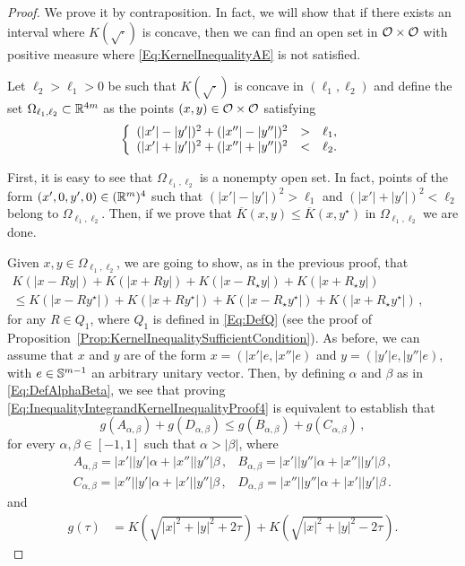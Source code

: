 \begin{proof}
We prove it by contraposition. In fact, we will show that if there exists an interval where $K(\sqrt{\cdot})$ is concave, then we can find an open set in $\mathcal{O} \times \mathcal{O}$ with positive measure where \eqref{Eq:KernelInequalityAE} is not satisfied.

Let $\ell_2>\ell_1>0$ be such that $K(\sqrt{\cdot})$ is concave in $(\ell_1,\ell_2)$ and define the set $\Omega_{\ell_1,\ell_2}\subset \mathbb{R}^{4m}$ as the points $(x,y)\in \mathcal{O}\times \mathcal{O}$ satisfying
\begin{equation}
\label{Eq:OmegaSetDefinition}
\left\{\begin{array}{rcll}
(|x'|-|y'|)^2+(|x''|-|y''|)^2&>&\ell_1,\\
(|x'|+|y'|)^2+(|x''|+|y''|)^2&<&\ell_2.
\end{array} \right.
\end{equation}

First, it is easy to see that $\Omega_{\ell_1,\ell_2}$ is a nonempty open set. In fact, points of the form $(x',0,y',0)\in (\mathbb{R}^m)^4$ such that $(|x'|-|y'|)^2>\ell_1$ and $(|x'|+|y'|)^2 <\ell_2$ belong to $\Omega_{\ell_1,\ell_2}$. Then, if we prove that $\overline{K}(x,y) \leq \overline{K}(x, y^\star)$ in $\Omega_{\ell_1,\ell_2}$ we are done.

Given $x,y\in \Omega_{\ell_1,\ell_2}$, we are going to show, as in the previous proof, that
\begin{equation}
\label{Eq:InequalityIntegrandKernelInequalityProof4}
\begin{split}
K(|x - R y|) + K(|x + R y|) + K(|x - R_\star y|) + K(|x + R_\star y|)
\quad \quad \quad \quad \quad \quad
\\
\leq
K(|x - R y^\star|) + K(|x + R y^\star|)+K(|x - R_\star y^\star|) + K(|x + R_\star y^\star|)\,, 
\end{split}
\end{equation}
for any $R\in Q_1$, where $Q_1$ is defined in \eqref{Eq:DefQ} (see the proof of Proposition~\ref{Prop:KernelInequalitySufficientCondition}). As before, we can assume that $x$ and $y$ are of the form $x = (|x'|e, |x''|e)$ and $y = (|y'|e, |y''|e)$, with $e \in \mathbb{S}^{m-1}$ an arbitrary unitary vector. Then, by defining $\alpha$ and $\beta$ as in \eqref{Eq:DefAlphaBeta}, we see that proving \eqref{Eq:InequalityIntegrandKernelInequalityProof4} is equivalent to establish that
\begin{equation}
\label{Eq:InequalityIntegrandKernelInequalityProof5}
g(A_{\alpha,\beta}) + g(D_{\alpha,\beta}) \leq g(B_{\alpha,\beta}) + g(C_{\alpha,\beta})\,,
\end{equation}
for every $\alpha, \beta \in [-1,1]$ such that $\alpha>|\beta|$, where
$$
\begin{array}{cc}
A_{\alpha,\beta} = |x'||y'|  \alpha + |x''||y''|\beta \,, &
B_{\alpha,\beta} = |x'||y''| \alpha + |x''||y'| \beta \,, \\
C_{\alpha,\beta} = |x''||y'| \alpha + |x'||y''| \beta \,, &
D_{\alpha,\beta} = |x''||y''|\alpha + |x'||y'|  \beta \,.
\end{array}
$$
and
\begin{align*}
g(\tau) &= K\left( \sqrt{|x|^2+|y|^2+2\tau} \right) + K\left( \sqrt{|x|^2+|y|^2-2\tau} \right).
\end{align*}





\end{proof}

